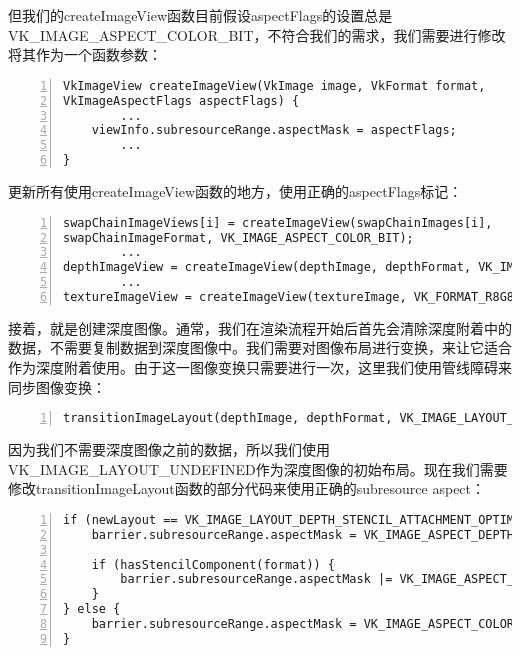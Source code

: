 \documentclass{ctexart}
\begin{document}
但我们的createImageView函数目前假设aspectFlags的设置总是VK\_IMAGE\_ASPECT\_COLOR\_BIT，不符合我们的需求，我们需要进行修改将其作为一个函数参数：

\begin{lstlisting}[language={[ANSI]C},keywordstyle=\color{blue!70},commentstyle=\color{red!50!green!50!blue!50},frame=shadowbox, rulesepcolor=\color{red!20!green!20!blue!20},basicstyle=\small,numbers=left, numberstyle=\tiny,breaklines=true]
VkImageView createImageView(VkImage image, VkFormat format,
VkImageAspectFlags aspectFlags) {
		...
	viewInfo.subresourceRange.aspectMask = aspectFlags;
		...
}
\end{lstlisting}

更新所有使用createImageView函数的地方，使用正确的aspectFlags标记：

\begin{lstlisting}[language={[ANSI]C},keywordstyle=\color{blue!70},commentstyle=\color{red!50!green!50!blue!50},frame=shadowbox, rulesepcolor=\color{red!20!green!20!blue!20},basicstyle=\small,numbers=left, numberstyle=\tiny,breaklines=true]
swapChainImageViews[i] = createImageView(swapChainImages[i],
swapChainImageFormat, VK_IMAGE_ASPECT_COLOR_BIT);
		...
depthImageView = createImageView(depthImage, depthFormat, VK_IMAGE_ASPECT_DEPTH_BIT);
		...
textureImageView = createImageView(textureImage, VK_FORMAT_R8G8B8A8_UNORM, VK_IMAGE_ASPECT_COLOR_BIT);
\end{lstlisting}

接着，就是创建深度图像。通常，我们在渲染流程开始后首先会清除深度附着中的数据，不需要复制数据到深度图像中。我们需要对图像布局进行变换，来让它适合作为深度附着使用。由于这一图像变换只需要进行一次，这里我们使用管线障碍来同步图像变换：

\begin{lstlisting}[language={[ANSI]C},keywordstyle=\color{blue!70},commentstyle=\color{red!50!green!50!blue!50},frame=shadowbox, rulesepcolor=\color{red!20!green!20!blue!20},basicstyle=\small,numbers=left, numberstyle=\tiny,breaklines=true]
transitionImageLayout(depthImage, depthFormat, VK_IMAGE_LAYOUT_UNDEFINED, VK_IMAGE_LAYOUT_DEPTH_STENCIL_ATTACHMENT_OPTIMAL);
\end{lstlisting}

因为我们不需要深度图像之前的数据，所以我们使用VK\_IMAGE\_LAYOUT\_UNDEFINED作为深度图像的初始布局。现在我们需要修改transitionImageLayout函数的部分代码来使用正确的subresource aspect：

\begin{lstlisting}[language={[ANSI]C},keywordstyle=\color{blue!70},commentstyle=\color{red!50!green!50!blue!50},frame=shadowbox, rulesepcolor=\color{red!20!green!20!blue!20},basicstyle=\small,numbers=left, numberstyle=\tiny,breaklines=true]
if (newLayout == VK_IMAGE_LAYOUT_DEPTH_STENCIL_ATTACHMENT_OPTIMAL) {
	barrier.subresourceRange.aspectMask = VK_IMAGE_ASPECT_DEPTH_BIT;

	if (hasStencilComponent(format)) {
		barrier.subresourceRange.aspectMask |= VK_IMAGE_ASPECT_STENCIL_BIT;
	}
} else {
	barrier.subresourceRange.aspectMask = VK_IMAGE_ASPECT_COLOR_BIT;
}
\end{lstlisting}
\end{document}
